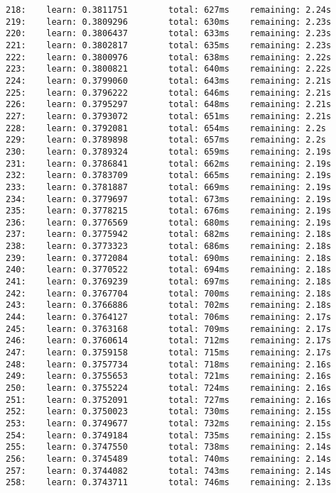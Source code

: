 \documentclass[11pt]{article}
\begin{document}
\begin{Verbatim}[commandchars=\\\{\}]
218:    learn: 0.3811751        total: 627ms    remaining: 2.24s
219:    learn: 0.3809296        total: 630ms    remaining: 2.23s
220:    learn: 0.3806437        total: 633ms    remaining: 2.23s
221:    learn: 0.3802817        total: 635ms    remaining: 2.23s
222:    learn: 0.3800976        total: 638ms    remaining: 2.22s
223:    learn: 0.3800821        total: 640ms    remaining: 2.22s
224:    learn: 0.3799060        total: 643ms    remaining: 2.21s
225:    learn: 0.3796222        total: 646ms    remaining: 2.21s
226:    learn: 0.3795297        total: 648ms    remaining: 2.21s
227:    learn: 0.3793072        total: 651ms    remaining: 2.21s
228:    learn: 0.3792081        total: 654ms    remaining: 2.2s
229:    learn: 0.3789898        total: 657ms    remaining: 2.2s
230:    learn: 0.3789324        total: 659ms    remaining: 2.19s
231:    learn: 0.3786841        total: 662ms    remaining: 2.19s
232:    learn: 0.3783709        total: 665ms    remaining: 2.19s
233:    learn: 0.3781887        total: 669ms    remaining: 2.19s
234:    learn: 0.3779697        total: 673ms    remaining: 2.19s
235:    learn: 0.3778215        total: 676ms    remaining: 2.19s
236:    learn: 0.3776569        total: 680ms    remaining: 2.19s
237:    learn: 0.3775942        total: 682ms    remaining: 2.18s
238:    learn: 0.3773323        total: 686ms    remaining: 2.18s
239:    learn: 0.3772084        total: 690ms    remaining: 2.18s
240:    learn: 0.3770522        total: 694ms    remaining: 2.18s
241:    learn: 0.3769239        total: 697ms    remaining: 2.18s
242:    learn: 0.3767704        total: 700ms    remaining: 2.18s
243:    learn: 0.3766886        total: 702ms    remaining: 2.18s
244:    learn: 0.3764127        total: 706ms    remaining: 2.17s
245:    learn: 0.3763168        total: 709ms    remaining: 2.17s
246:    learn: 0.3760614        total: 712ms    remaining: 2.17s
247:    learn: 0.3759158        total: 715ms    remaining: 2.17s
248:    learn: 0.3757734        total: 718ms    remaining: 2.16s
249:    learn: 0.3755653        total: 721ms    remaining: 2.16s
250:    learn: 0.3755224        total: 724ms    remaining: 2.16s
251:    learn: 0.3752091        total: 727ms    remaining: 2.16s
252:    learn: 0.3750023        total: 730ms    remaining: 2.15s
253:    learn: 0.3749677        total: 732ms    remaining: 2.15s
254:    learn: 0.3749184        total: 735ms    remaining: 2.15s
255:    learn: 0.3747550        total: 738ms    remaining: 2.14s
256:    learn: 0.3745489        total: 740ms    remaining: 2.14s
257:    learn: 0.3744082        total: 743ms    remaining: 2.14s
258:    learn: 0.3743711        total: 746ms    remaining: 2.13s

\end{Verbatim}
\end{document}
